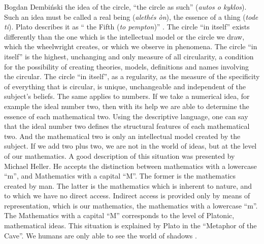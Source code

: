 \begin{artengenv}{Bogdan Dembiński}
 the idea of the circle, ``the circle as such'' (\textit{autos o kyklos}). Such an idea must be called a real being
(\textit{alethés òn}), the essence of a thing (\textit{tode ti}). Plato describes it as ``%
the Fifth (\textit{to pempton})''
\parencite[\textit{Letters}, 342a-343d]{plato_platonis_1955}.
The circle ``in itself''
exists differently than the one which is the intellectual model or the circle we draw, which the wheelwright creates,
or which we observe in phenomena. The circle ``in itself'' is the highest, unchanging and only measure of all
circularity, a condition for the possibility of creating theories, models, definitions and names %
involving the circular. The circle ``in itself'', as a regularity, as the measure of the specificity of everything that is
circular, is unique, unchangeable and independent of the subject’s %
beliefs.%
The same applies to numbers. If we take a numerical idea, for example the ideal number two, then with its help we are
able to determine the essence of each mathematical two. Using the descriptive language, one can say that the ideal
number two defines the structural features of each mathematical two. And the mathematical two is only an intellectual
model created by the subject. If we add two plus two, we are not in the world of ideas, but at the level of our
mathematics. A good description of this situation was presented by Michael Heller. He accepts the distinction between
mathematics with a lowercase ``m'', and Mathematics with a capital ``M''. The former is the mathematics created by man. The
latter is the mathematics which is inherent to nature, and to which we have no direct access. Indirect access is
provided only by means of representation, which is our mathematics, the mathematics with a lowercase ``m''. The
Mathematics with a capital ``M'' corresponds to the level of Platonic, mathematical ideas. This situation is explained by
Plato in the ``Metaphor of the Cave''. We humans are only able to see the world of shadows
\parencite[\textit{Republic}, 514-518d]{plato_platonis_1955}.

\end{artengenv}
